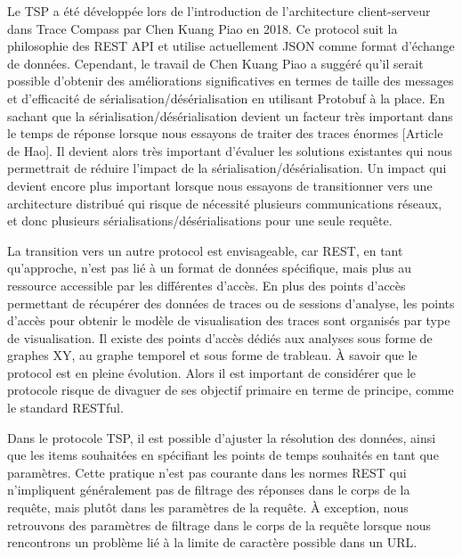 Le TSP a été développée lors de l'introduction de l'architecture client-serveur dans Trace Compass par Chen Kuang Piao en 2018. Ce protocol suit la philosophie des REST API et utilise actuellement JSON comme format d'échange de données. Cependant, le travail de Chen Kuang Piao a suggéré qu'il serait possible d'obtenir des améliorations significatives en termes de taille des messages et d'efficacité de sérialisation/désérialisation en utilisant Protobuf à la place. En sachant que la sérialisation/désérialisation devient un facteur très important dans le temps de réponse lorsque nous essayons de traiter des traces énormes [Article de Hao]. Il devient alors très important d'évaluer les solutions existantes qui nous permettrait de réduire l'impact de la sérialisation/désérialisation. Un impact qui devient encore plus important lorsque nous essayons de transitionner vers une architecture distribué qui risque de nécessité plusieurs communications réseaux, et donc plusieurs sérialisations/désérialisations pour une seule requête.

La transition vers un autre protocol est envisageable, car REST, en tant qu'approche, n'est pas lié à un format de données spécifique, mais plus au ressource accessible par les différentes d'accès. En plus des points d'accès permettant de récupérer des données de traces ou de sessions d'analyse, les points d'accès pour obtenir le modèle de visualisation des traces sont organisés par type de visualisation. Il existe des points d'accès dédiés aux analyses sous forme de graphes XY, au graphe temporel et sous forme de trableau. À savoir que le protocol est en pleine évolution. Alors il est important de considérer que le protocole risque de divaguer de ses objectif primaire en terme de principe, comme le standard RESTful.

Dans le protocole TSP, il est possible d'ajuster la résolution des données, ainsi que les items souhaitées en spécifiant les points de temps souhaités en tant que paramètres. Cette pratique n'est pas courante dans les normes REST qui n'impliquent généralement pas de filtrage des réponses dans le corps de la requête, mais plutôt dans les paramètres de la requête. À exception, nous retrouvons des paramètres de filtrage dans le corps de la requête lorsque nous rencontrons un problème lié à la limite de caractère possible dans un URL.





